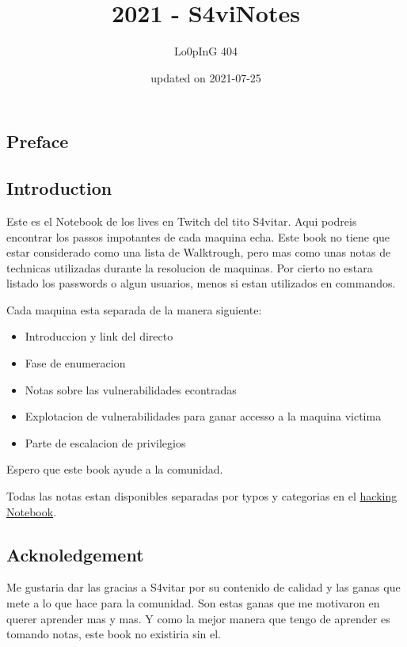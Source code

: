 \documentclass{assets/ipesethesis}
\title{2021 - S4viNotes}
\author{Lo0pInG 404}
\date{updated on 2021-07-25}
\providecommand{\tightlist}{%
  \setlength{\itemsep}{0pt}\setlength{\parskip}{0pt}}
\begin{document}
  \maketitle

\frontmatter %


  \begin{resume}
    \hypertarget{preface}{%
    \section*{Preface}\label{preface}}
    
    \hypertarget{introduction}{%
    \subsection*{Introduction}\label{introduction}}
    
    Este es el Notebook de los lives en Twitch del tito S4vitar. Aqui podreis encontrar los passos impotantes de cada maquina
    echa. Este book no tiene que estar considerado como una lista de Walktrough, pero mas como unas notas de technicas utilizadas
    durante la resolucion de maquinas. Por cierto no estara listado los passwords o algun usuarios, menos si estan utilizados en
    commandos.
    
    Cada maquina esta separada de la manera siguiente:
    
    \begin{itemize}
    \tightlist
    \item
      Introduccion y link del directo
    \item
      Fase de enumeracion
    \item
      Notas sobre las vulnerabilidades econtradas
    \item
      Explotacion de vulnerabilidades para ganar accesso a la maquina victima
    \item
      Parte de escalacion de privilegios
    \end{itemize}
    
    Espero que este book ayude a la comunidad.
    
    Todas las notas estan disponibles separadas por typos y categorias en el \href{https://looping404.michellopez.org}{hacking Notebook}.
    
    \hypertarget{acknoledgement}{%
    \subsection*{Acknoledgement}\label{acknoledgement}}
    
    Me gustaria dar las gracias a S4vitar por su contenido de calidad y las ganas que mete a lo que hace para la comunidad.
    Son estas ganas que me motivaron en querer aprender mas y mas. Y como la mejor manera que tengo de aprender es tomando notas,
    este book no existiria sin el.
  \end{resume}
\end{document}

